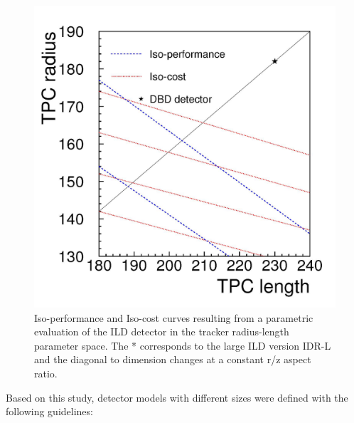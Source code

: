 \begin{figure}[t!]
\centering
\includegraphics[width=0.6\hsize]{ILD/fig/aspect_ratio.jpg}
\caption{Iso-performance and Iso-cost curves resulting from a parametric evaluation of the ILD detector in the tracker radius-length parameter space. The * corresponds to the large ILD version IDR-L and the diagonal to dimension changes at a constant r/z aspect ratio.}
\label{fig:ILD:aspect_ratio}
\end{figure}

Based on this study, detector models with different sizes were defined with the following guidelines:

